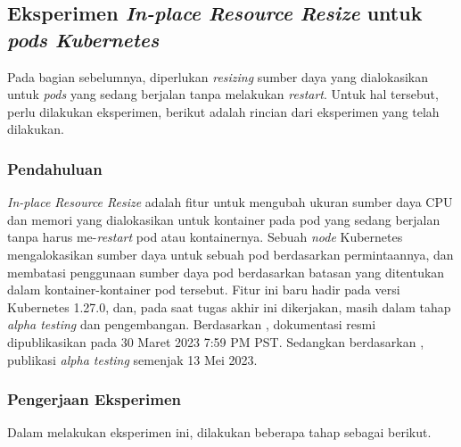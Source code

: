 \subsection{Eksperimen \textit{In-place Resource Resize} untuk \textit{pods Kubernetes}}

Pada bagian sebelumnya, diperlukan \textit{resizing} sumber daya yang dialokasikan untuk \textit{pods} yang sedang berjalan tanpa melakukan \textit{restart}. Untuk hal tersebut, perlu dilakukan eksperimen, berikut adalah rincian dari eksperimen yang telah dilakukan.

\subsubsection{Pendahuluan}

\textit{In-place Resource Resize} adalah fitur untuk mengubah ukuran sumber daya CPU dan memori yang dialokasikan untuk kontainer pada pod yang sedang berjalan tanpa harus me-\textit{restart} pod atau kontainernya. Sebuah \textit{node} Kubernetes mengalokasikan sumber daya untuk sebuah pod berdasarkan permintaannya, dan membatasi penggunaan sumber daya pod berdasarkan batasan yang ditentukan dalam kontainer-kontainer pod tersebut. Fitur ini baru hadir pada versi Kubernetes 1.27.0, dan, pada saat tugas akhir ini dikerjakan, masih dalam tahap \textit{alpha testing} dan pengembangan. Berdasarkan \parencite{kubeinplaceupdate2}, dokumentasi resmi dipublikasikan pada 30 Maret 2023 7:59 PM PST. Sedangkan berdasarkan \parencite{kubeinplaceupdate}, publikasi \textit{alpha testing} semenjak 13 Mei 2023.

\subsubsection{Pengerjaan Eksperimen}
Dalam melakukan eksperimen ini, dilakukan beberapa tahap sebagai berikut.

